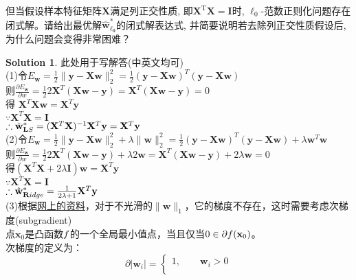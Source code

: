 \documentclass[a4paper,UTF8]{article}
\numberwithin{equation}{section}
\theoremstyle{definition}
\newtheorem*{solution}{Solution}
\begin{document}
但当假设样本特征矩阵$\mathbf{X}$满足列正交性质, 即$\mathbf{X}^\mathrm{T}\mathbf{X} = \mathbf{I}$时, $\ell_0$-范数正则化问题存在闭式解。请给出最优解$\hat{\mathbf{w}}_{\mathbf{\ell_0}}^*$的闭式解表达式, 并简要说明若去除列正交性质假设后, 为什么问题会变得非常困难？

\begin{solution}
此处用于写解答(中英文均可)\\
(1)令$E_{\mathbf w} = \frac{1}{2}\lVert \mathbf y - \mathbf X \mathbf w \rVert_2^2 = \frac{1}{2}(\mathbf y - \mathbf X \mathbf w)^T(\mathbf y - \mathbf X \mathbf w)$\\
则$\frac{\partial E_{\mathbf w}}{\partial w} = \frac{1}{2} 2 \mathbf{X}^T (\mathbf X \mathbf w - \mathbf y) = \mathbf{X}^T (\mathbf X \mathbf w - \mathbf y) = 0$\\
得 $\mathbf{X}^T\mathbf X \mathbf w = \mathbf{X}^T\mathbf y$\\
$\because \mathbf{X}^T\mathbf X = \mathbf I$\\
$\therefore \hat{\mathbf w}^*_{\textbf LS} = (\mathbf{X}^T\mathbf X)^{-1}\mathbf{X}^T\mathbf y = \mathbf{X}^T\mathbf y$\\
(2)令$E_{\mathbf w} = \frac{1}{2}\lVert \mathbf y - \mathbf X \mathbf w \rVert_2^2 + \lambda \lVert \mathbf w\rVert_2^2= \frac{1}{2}(\mathbf y - \mathbf X \mathbf w)^T(\mathbf y - \mathbf X \mathbf w) + \lambda \mathbf{w}^T\mathbf w$\\
则$\frac{\partial E_{\mathbf w}}{\partial w} = \frac{1}{2} 2 \mathbf{X}^T (\mathbf X \mathbf w - \mathbf y) + \lambda 2 \mathbf w= \mathbf{X}^T (\mathbf X \mathbf w - \mathbf y) + 2\lambda \mathbf w=0$\\
得$(\mathbf{X}^T\mathbf X + 2\lambda \mathbf I)\mathbf w = \mathbf{X}^T\mathbf y$\\
$\because \mathbf{X}^T\mathbf X = \mathbf I$\\
$\therefore \hat{\mathbf w}^*_{\textbf Ridge} = \frac{1}{2\lambda + 1}\mathbf{X}^T\mathbf y$\\
(3)根据\href{http://freemind.pluskid.org/machine-learning/sparsity-and-some-basics-of-l1-regularization/}{网上的资料}，对于不光滑的$\lVert \mathbf w \rVert_1$，它的梯度不存在，这时需要考虑次梯度(subgradient)\\
点$\mathbf x_0$是凸函数$\mathnormal{f}$的一个全局最小值点，当且仅当$0 \in \partial\mathnormal{f}(\mathbf x_0)$。\\
次梯度的定义为：$$\partial \vert \mathbf w_i\vert =
\begin{cases}
1, \qquad \mathbf w_i > 0  \\

\end{cases}$$
\end{solution}
\end{document}
